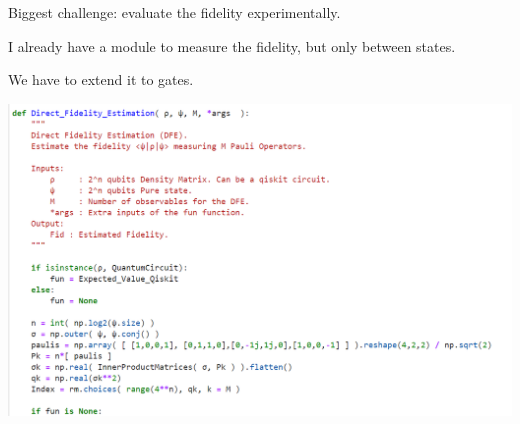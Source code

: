 \documentclass[12pt,aspectratio=169]{beamer}
\begin{document}
	
	\begin{frame}
		\centering
		Biggest challenge: evaluate the fidelity experimentally.
		
		I already have a module to measure the fidelity, but only between states. 
		
		We have to extend it to gates.
		
		\includegraphics[scale=0.5]{direct_fidelity}
		
	\end{frame}
	
	
\end{document}
